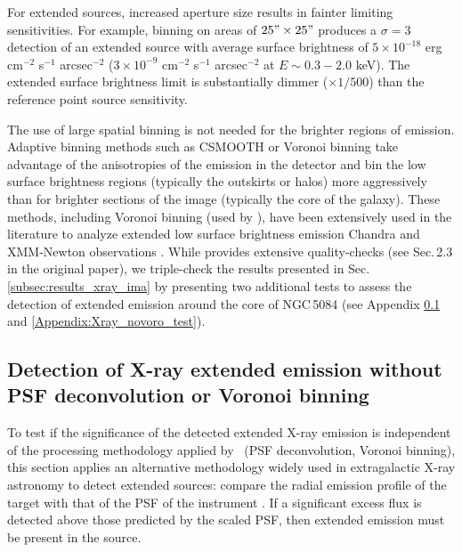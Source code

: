 \documentclass[modern]{CORE-AAS/aastex631}
\begin{document}
For extended sources, increased aperture size results in fainter limiting sensitivities. For example, binning on areas of $25"\times25"$ produces a $\sigma=3$ detection of an extended source with average surface brightness of $5\times10^{-18}$ erg cm$^{-2}$ s$^{-1}$ arcsec$^{-2}$ ($3\times10^{-9}$ cm$^{-2}$ s$^{-1}$ arcsec$^{-2}$ at $E\sim0.3-2.0$ keV). The extended surface brightness limit is substantially dimmer ($\times1/500$) than the reference point source sensitivity.

The use of large spatial binning is not needed for the brighter regions of emission. Adaptive binning methods such as CSMOOTH \citep{ebeling+2006mnras368_65} or Voronoi binning \citep{cappellari+2003mnras342_345, diehl+2006mnras368_497} take advantage of the anisotropies of the emission in the detector and bin the low surface brightness regions (typically the outskirts or halos) more aggressively than for brighter sections of the image (typically the core of the galaxy). These methods, including Voronoi binning (used by \SAUNAS), have been extensively used in the literature to analyze extended low surface brightness emission Chandra and XMM-Newton observations \citep[see ][and references therein]{ebeling+2007apj661_33,gonzalezmartin+2009aap506_1107,broos+2010apj714_1582, ebeling+2010mnras407_83, xue+2011apj195_10, hodgeskluck+2012apj746_167, wang+2024apj962_188}. While \citet[][\SAUNAS\, I]{borlaff+2024apj967_169} provides extensive quality-checks (see Sec.\,2.3 in the original paper), we triple-check the results presented in Sec.\,\ref{subsec:results_xray_ima} by presenting two additional tests to assess the detection of extended emission around the core of NGC\,5084 (see Appendix \ref{Appendix:Xray_noPSFdeco_test} and \ref{Appendix:Xray_novoro_test}).


\subsection{Detection of X-ray extended emission without PSF deconvolution or Voronoi binning}
\label{Appendix:Xray_noPSFdeco_test}

To test if the significance of the detected extended X-ray emission is independent of the processing methodology applied by \SAUNAS\ (PSF deconvolution, Voronoi binning), this section applies an alternative methodology widely used in extragalactic X-ray astronomy to detect extended sources: compare the radial emission profile of the target with that of the PSF of the instrument \citep{fabbiano+2017apj842_4,fabbiano+2018apj855_131, jones+2020apj891_133,ma+2020apj900_164,ma+2023apj948_61}. If a significant excess flux is detected above those predicted by the scaled PSF, then extended emission must be present in the source.
\end{document}
